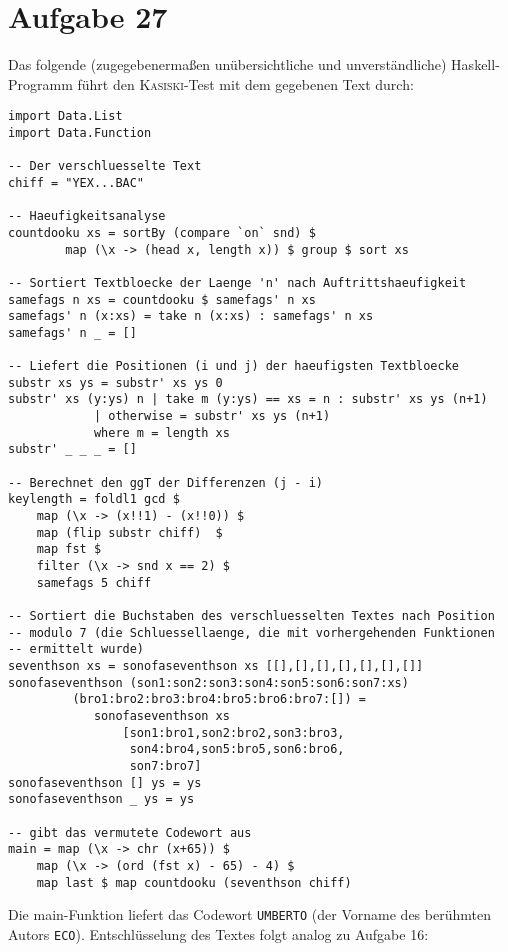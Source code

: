 \section*{Aufgabe 27}
Das folgende (zugegebenermaßen unübersichtliche und unverständliche)
Haskell-Programm führt den \textsc{Kasiski}-Test mit dem gegebenen Text durch:
\lstset{language=Haskell}
\begin{lstlisting}
import Data.List
import Data.Function

-- Der verschluesselte Text
chiff = "YEX...BAC"

-- Haeufigkeitsanalyse
countdooku xs = sortBy (compare `on` snd) $
		map (\x -> (head x, length x)) $ group $ sort xs

-- Sortiert Textbloecke der Laenge 'n' nach Auftrittshaeufigkeit
samefags n xs = countdooku $ samefags' n xs
samefags' n (x:xs) = take n (x:xs) : samefags' n xs
samefags' n _ = []

-- Liefert die Positionen (i und j) der haeufigsten Textbloecke
substr xs ys = substr' xs ys 0
substr' xs (y:ys) n | take m (y:ys) == xs = n : substr' xs ys (n+1)
		    | otherwise = substr' xs ys (n+1)
			where m = length xs
substr' _ _ _ = []

-- Berechnet den ggT der Differenzen (j - i)
keylength = foldl1 gcd $
	map (\x -> (x!!1) - (x!!0)) $
	map (flip substr chiff)  $
	map fst $
	filter (\x -> snd x == 2) $
	samefags 5 chiff

-- Sortiert die Buchstaben des verschluesselten Textes nach Position
-- modulo 7 (die Schluessellaenge, die mit vorhergehenden Funktionen 
-- ermittelt wurde)
seventhson xs = sonofaseventhson xs [[],[],[],[],[],[],[]]
sonofaseventhson (son1:son2:son3:son4:son5:son6:son7:xs)
		 (bro1:bro2:bro3:bro4:bro5:bro6:bro7:[]) = 
			sonofaseventhson xs
				[son1:bro1,son2:bro2,son3:bro3,
				 son4:bro4,son5:bro5,son6:bro6,
				 son7:bro7]
sonofaseventhson [] ys = ys
sonofaseventhson _ ys = ys

-- gibt das vermutete Codewort aus
main = map (\x -> chr (x+65)) $
	map (\x -> (ord (fst x) - 65) - 4) $
	map last $ map countdooku (seventhson chiff)
\end{lstlisting}
Die main-Funktion liefert das Codewort \verb/UMBERTO/ (der Vorname des
berühmten Autors \verb/ECO/). Entschlüsselung des Textes folgt analog zu
Aufgabe 16:
